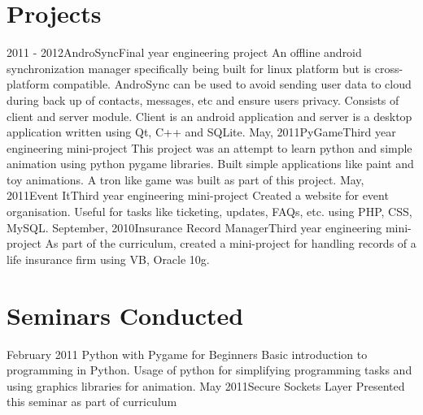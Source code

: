 \documentclass[12pt,a4paper]{moderncv}
\begin{document}

\section{Projects}
\cventry
{2011 - 2012}{AndroSync}{Final year engineering project}{}{}
{An offline android synchronization manager specifically being built for linux platform but is cross-platform compatible. AndroSync can be used to avoid sending user data to cloud during back up of contacts, messages, etc and ensure users privacy. Consists of client and server module. Client is an android application and server is a desktop application written using Qt, C++ and SQLite.}
\vspace{.1in}
\cventry
{May, 2011}{PyGame}{Third year engineering mini-project}{}{}
{This project was an attempt to learn python and simple animation using python pygame libraries. Built simple applications like paint and toy
animations. A tron like game was built as part of this project. }
\vspace{.1in}
\cventry
{May, 2011}{Event It}{Third year engineering mini-project}{}{}
{Created a website for event organisation. Useful for tasks like ticketing, updates, FAQs, etc. using PHP, CSS, MySQL. }
\vspace{.1in}
\cventry
{September, 2010}{Insurance Record Manager}{Third year engineering mini-project}{}{}
{As part of the curriculum, created a mini-project for handling records of a life insurance firm using VB, Oracle 10g. }

\section{Seminars Conducted}
\cventry
{February 2011}
{Python with Pygame for Beginners}{}{}{}
{Basic introduction to programming in Python. Usage of python for simplifying programming tasks and using graphics libraries for animation.}
\vspace{.1in}
\cventry
{May 2011}{Secure Sockets Layer}{}{}{}
{Presented this seminar as part of curriculum}
\end{document}
